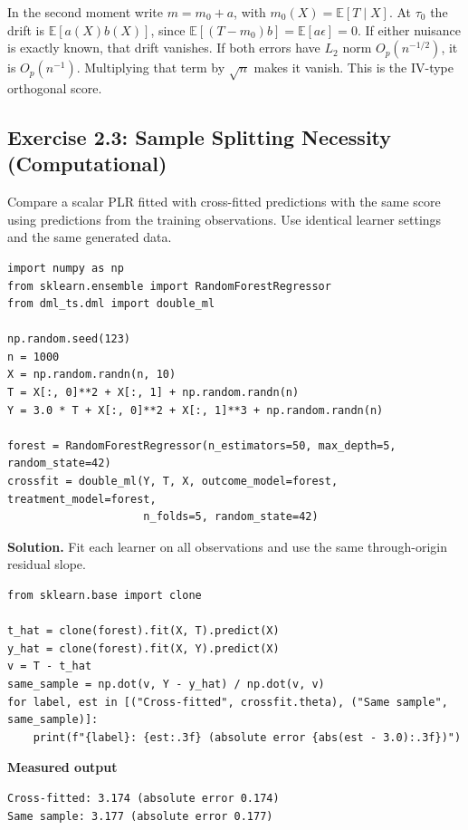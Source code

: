 In the second moment write \(m=m_0+a\), with \(m_0(X)=\mathbb E[T\mid X]\). At \(\tau_0\) the drift is \(\mathbb E[a(X)b(X)]\), since \(\mathbb E[(T-m_0)b]=\mathbb E[a\epsilon]=0\). If either nuisance is exactly known, that drift vanishes. If both errors have \(L_2\) norm \(O_p(n^{-1/2})\), it is \(O_p(n^{-1})\). Multiplying that term by \(\sqrt{n}\) makes it vanish. This is the IV-type orthogonal score.

\subsection{Exercise 2.3: Sample Splitting Necessity
(Computational)}\label{_exercise_2_3_sample_splitting_necessity_computational}

Compare a scalar PLR fitted with cross-fitted predictions with the same score using predictions from the training observations. Use identical learner settings and the same generated data.

\begin{verbatim}
import numpy as np
from sklearn.ensemble import RandomForestRegressor
from dml_ts.dml import double_ml

np.random.seed(123)
n = 1000
X = np.random.randn(n, 10)
T = X[:, 0]**2 + X[:, 1] + np.random.randn(n)
Y = 3.0 * T + X[:, 0]**2 + X[:, 1]**3 + np.random.randn(n)

forest = RandomForestRegressor(n_estimators=50, max_depth=5, random_state=42)
crossfit = double_ml(Y, T, X, outcome_model=forest, treatment_model=forest,
                     n_folds=5, random_state=42)
\end{verbatim}

\textbf{Solution.} Fit each learner on all observations and use the same through-origin residual slope.

\begin{verbatim}
from sklearn.base import clone

t_hat = clone(forest).fit(X, T).predict(X)
y_hat = clone(forest).fit(X, Y).predict(X)
v = T - t_hat
same_sample = np.dot(v, Y - y_hat) / np.dot(v, v)
for label, est in [("Cross-fitted", crossfit.theta), ("Same sample", same_sample)]:
    print(f"{label}: {est:.3f} (absolute error {abs(est - 3.0):.3f})")
\end{verbatim}

\textbf{Measured output}

\begin{verbatim}
Cross-fitted: 3.174 (absolute error 0.174)
Same sample: 3.177 (absolute error 0.177)
\end{verbatim}

